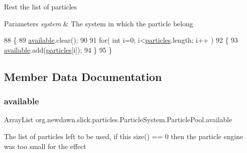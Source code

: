 Rest the list of particles


\begin{DoxyParams}{Parameters}
{\em system} & The system in which the particle belong \\
\hline
\end{DoxyParams}

\begin{DoxyCode}
88                                                  \{
89             \mbox{\hyperlink{classorg_1_1newdawn_1_1slick_1_1particles_1_1_particle_system_1_1_particle_pool_aec7206b9670d0a0826151c81b89f8681}{available}}.clear();
90             
91             \textcolor{keywordflow}{for}( \textcolor{keywordtype}{int} i=0; i<\mbox{\hyperlink{classorg_1_1newdawn_1_1slick_1_1particles_1_1_particle_system_1_1_particle_pool_a6b4dcf4ad8123ed1dd510d1e50ba7adf}{particles}}.length; i++ )
92             \{
93                 \mbox{\hyperlink{classorg_1_1newdawn_1_1slick_1_1particles_1_1_particle_system_1_1_particle_pool_aec7206b9670d0a0826151c81b89f8681}{available}}.add(\mbox{\hyperlink{classorg_1_1newdawn_1_1slick_1_1particles_1_1_particle_system_1_1_particle_pool_a6b4dcf4ad8123ed1dd510d1e50ba7adf}{particles}}[i]);
94             \}
95         \}
\end{DoxyCode}


\subsection{Member Data Documentation}
\mbox{\label{classorg_1_1newdawn_1_1slick_1_1particles_1_1_particle_system_1_1_particle_pool_aec7206b9670d0a0826151c81b89f8681}} 
\subsubsection{\texorpdfstring{available}{available}}
{\footnotesize\ttfamily Array\+List org.\+newdawn.\+slick.\+particles.\+Particle\+System.\+Particle\+Pool.\+available}

The list of particles left to be used, if this size() == 0 then the particle engine was too small for the effect \mbox{\label{classorg_1_1newdawn_1_1slick_1_1particles_1_1_particle_system_1_1_particle_pool_a6b4dcf4ad8123ed1dd510d1e50ba7adf}} 
